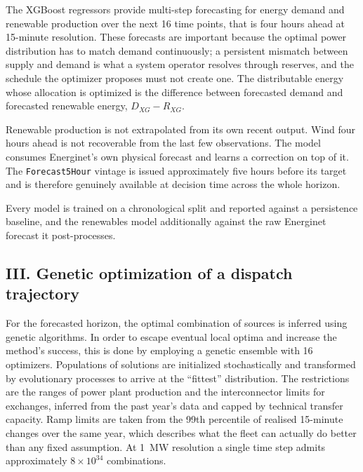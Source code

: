 \documentclass[11pt]{article}
\begin{document}
The XGBoost regressors provide multi-step forecasting for energy demand and
renewable production over the next 16 time points, that is four hours ahead
at 15-minute resolution. These forecasts are important because the optimal
power distribution has to match demand continuously; a persistent mismatch
between supply and demand is what a system operator resolves through
reserves, and the schedule the optimizer proposes must not create one. The
distributable energy whose allocation is optimized is the difference
between forecasted demand and forecasted renewable energy,
$D_{XG} - R_{XG}$.

Renewable production is not extrapolated from its own recent output. Wind
four hours ahead is not recoverable from the last few observations. The
model consumes Energinet's own physical forecast and learns a correction
on top of it. The \texttt{Forecast5Hour} vintage is issued approximately
five hours before its target and is therefore genuinely available at
decision time across the whole horizon.

Every model is trained on a chronological split and reported against a
persistence baseline, and the renewables model additionally against the
raw Energinet forecast it post-processes.

\subsection{III. Genetic optimization of a dispatch trajectory}

For the forecasted horizon, the optimal combination of sources is inferred
using genetic algorithms. In order to escape eventual local optima and
increase the method's success, this is done by employing a genetic ensemble
with 16 optimizers. Populations of solutions are initialized stochastically
and transformed by evolutionary processes to arrive at the ``fittest''
distribution. The restrictions are the ranges of power plant production and
the interconnector limits for exchanges, inferred from the past year's data
and capped by technical transfer capacity. Ramp limits are taken from the
99th percentile of realised 15-minute changes over the same year, which
describes what the fleet can actually do better than any fixed assumption.
At 1~MW resolution a single time step admits approximately $8 \times 10^{34}$
combinations.
\end{document}
